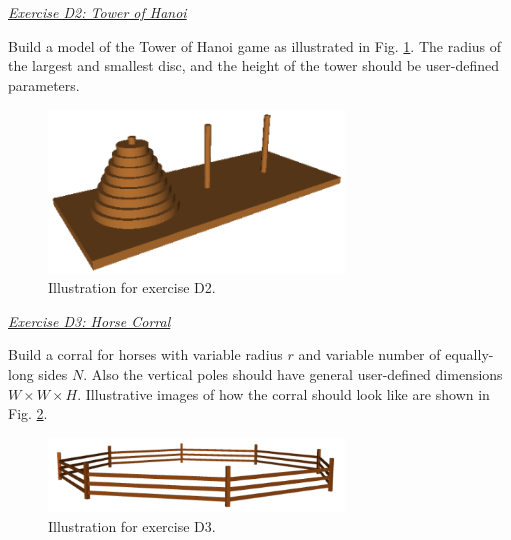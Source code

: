\documentclass[article,A4,12pt]{llncs}
\begin{document}
\noindent
\underline{\em Exercise D2: Tower of Hanoi}

Build a model of the Tower of Hanoi game as illustrated in Fig. \ref{fig:hanoi}. 
The radius of the largest and smallest disc, and the height of the tower 
should be user-defined parameters. 

\newpage

\begin{figure}[!ht]
\begin{center}
\includegraphics[width=0.7\textwidth]{img/hanoi.png}
\end{center}
\vspace{-2mm}
\caption{Illustration for exercise D2.}
\label{fig:hanoi}
\end{figure}
\noindent



\noindent
\underline{\em Exercise D3: Horse Corral}

Build a corral for horses with variable radius $r$ and variable number 
of equally-long sides $N$. Also the vertical poles should have general user-defined 
dimensions $W \times W \times H$. Illustrative images of how the corral should look like 
are shown in Fig. \ref{fig:corral2}.

\begin{figure}[!ht]
\begin{center}
\includegraphics[width=0.7\textwidth]{img/tam-3.png}
\end{center}
\vspace{-2mm}
\caption{Illustration for exercise D3.}
\label{fig:corral2}
\end{figure}
\noindent
\end{document}
